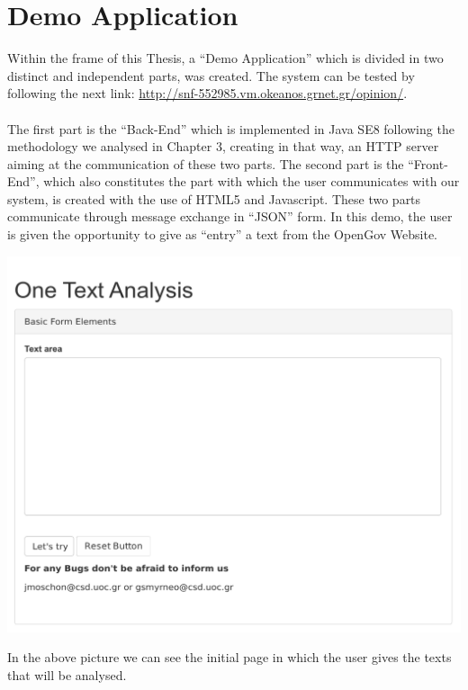 
\chapter{Demo Application}\label{ch_5}
Within the frame of this Thesis, a ``Demo Application'' which is divided in two distinct and independent parts, was created. The system can be tested by following the next link: \url{http://snf-552985.vm.okeanos.grnet.gr/opinion/}.\\
\\
The first part is the ``Back-End'' which is implemented in Java SE8 following the methodology we analysed in Chapter 3, creating in that way, an HTTP server aiming at the communication of these two parts. The second part is the ``Front-End'', which also constitutes the part with which the user communicates with our system, is created with the use of HTML5 and Javascript. These two parts communicate through message exchange in ``JSON'' form. In this demo, the user is given the opportunity to give as ``entry'' a text from the OpenGov  Website.

\centerline{\includegraphics[width=0.85\linewidth]{figure/screens/screen1_vector.pdf}}

In the above picture we can see the initial page in which the user gives the texts that will be analysed.\\
\\

